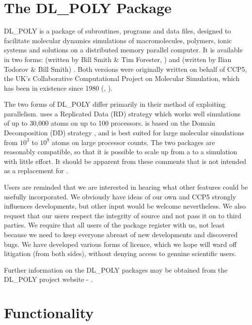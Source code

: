 \section{The DL\_POLY Package}

DL\_POLY \cite{smith-96a} is a package of subroutines, programs and
data files, designed to facilitate molecular dynamics simulations of
macromolecules, polymers, ionic systems and solutions on a
distributed memory parallel computer. It is available in two forms:
\C (written by Bill Smith \& Tim Forester, \WEC{}) and \D (written
by Ilian Todorov \& Bill Smith) \cite{todorov-04a,todorov-06a}.  Both versions
were originally written on behalf of CCP5, the UK's
Collaborative Computational Project on Molecular Simulation, which
has been in existence since 1980 (\cite{smith-87a}, \WEB{}).

The two forms of DL\_POLY differ primarily in their method of
exploiting parallelism.  \C uses a Replicated Data (RD)
strategy \cite{smith-91a,smith-93a,smith-94a,smith-94b} which
works well simulations of up to 30,000 atoms on up to 100 processors.
\D is based on the Domain Decomposition (DD) strategy
\cite{todorov-04a,todorov-06a,pinches-91a,rapaport-91b,smith-91a,smith-93a},
and is best suited for large molecular simulations from $10^{3}$
to $10^{9}$ atoms on large processor counts.  The two packages
are reasonably compatible, so that it is possible to scale up from
a \C to a \D simulation with little effort.  It should
be apparent from these comments that \D is not intended as a
replacement for \C.

Users are reminded that we are interested in hearing what other
features could be usefully incorporated.  We obviously have ideas
of our own and CCP5 strongly influences developments,
but other input would be welcome nevertheless.  We also request
that our users respect the integrity of \D source and not pass it
on to third parties.  We require that all users of the package
register with us, not least because we need to keep everyone
abreast of new developments and discovered bugs.  We have
developed various forms of licence, which we hope
will ward off litigation (from both sides), without denying access
to genuine scientific users.

Further information on the DL\_POLY packages may be obtained from
the DL\_POLY project website - \noindent \WEB{}.

\section{Functionality}


